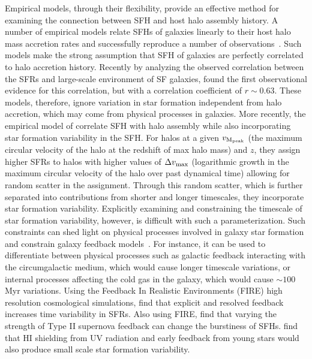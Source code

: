 \documentclass[12pt, letterpaper, preprint, tighten]{aastex62}
\begin{document}
Empirical models, through their flexibility, provide an effective 
method for examining the connection between SFH and host halo assembly 
history. A number of empirical models relate SFHs of galaxies linearly 
to their host halo mass accretion rates and successfully reproduce a 
number of observations~\citep{taghizadeh-popp2015, becker2015, rodriguez-puebla2016a, mitra2017, cohn2017, moster2017}. 
Such models
make the strong assumption that SFH of galaxies are perfectly 
correlated to halo accretion history. Recently by analyzing the observed 
correlation between the SFRs and large-scale environment of SF galaxies, 
\cite{tinker2018b} found the first observational evidence for this 
correlation, but with a correlation coefficient of $r \sim 0.63$.
These models, therefore, ignore variation in star formation independent 
from halo accretion, which may come from physical processes in galaxies. 
More recently, the empirical model of \cite{behroozi2019} correlate SFH
with halo assembly while also incorporating star formation variability in
the SFH. For halos at a given $v_{\rm M_{peak}}$ (the maximum circular
velocity of the halo at the redshift of max halo mass) and $z$, they
assign higher SFRs to halos with higher values of $\Delta v_{\rm max}$
(logarithmic growth in the maximum circular velocity of the halo over past dynamical time)
allowing for random scatter in the assignment. Through this random scatter,
which is further separated into contributions from shorter and longer timescales,
they incorporate star formation variability. Explicitly examining and constraining
the timescale of star formation variability, however, is difficult with such a
parameterization. Such constraints can shed light on physical processes 
involved in galaxy star formation and constrain galaxy feedback 
models~\citep{sparre2015}. For instance, it can be used to differentiate 
between physical processes such as galactic feedback interacting with the 
circumgalactic medium, which would cause longer timescale variations, or 
internal processes affecting the cold gas in the galaxy, which would cause 
$\sim 100$ Myr variations. Using the Feedback In Realistic Environments 
(FIRE) high resolution cosmological simulations, \cite{hopkins2014} find 
that explicit and resolved feedback increases time variability in SFRs.
Also using FIRE, \cite{sparre2017} find that varying the strength of
Type II supernova feedback can change the burstiness of SFHs.
\cite{governato2015} find that HI shielding from UV radiation and
early feedback from young stars would also produce small scale star
formation variability.
\end{document}

